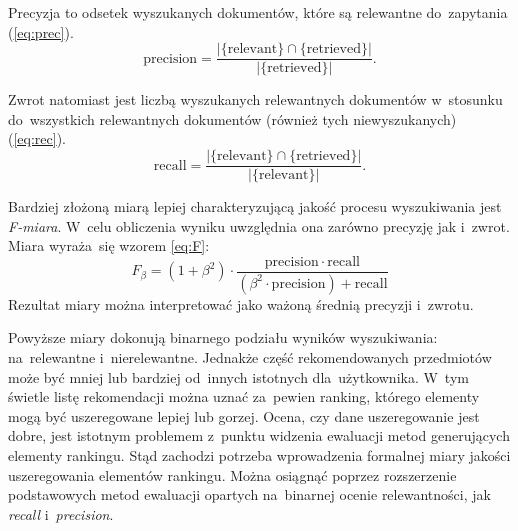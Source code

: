 \documentclass[pl]{minipw} %
\begin{document}
Precyzja to odsetek wyszukanych dokumentów, które są relewantne do~zapytania (\ref{eq:prec}). 
\begin{equation}
\label{eq:prec}
\mathrm{precision}=\frac{|\{\mathrm{relevant}\} \cap \{\mathrm{retrieved}\}|}{|\{\mathrm{retrieved}\}|}.
\end{equation}

Zwrot natomiast jest liczbą wyszukanych relewantnych dokumentów w~stosunku do~wszystkich relewantnych dokumentów (również tych niewyszukanych) (\ref{eq:rec}).
\begin{equation}
\label{eq:rec}
\mathrm{recall}=\frac{|\{\mathrm{relevant}\} \cap \{\mathrm{retrieved}\}|}{|\{\mathrm{relevant}\}|}.
\end{equation}

Bardziej złożoną miarą lepiej charakteryzującą jakość procesu wyszukiwania jest \textit{F-miara}. W~celu obliczenia wyniku uwzględnia ona zarówno precyzję jak i~zwrot. Miara wyraża~się wzorem \ref{eq:F}:
\begin{equation}
\label{eq:F}
F_\beta = (1 + \beta^2) \cdot \frac{\mathrm{precision} \cdot \mathrm{recall}}{(\beta^2 \cdot \mathrm{precision}) + \mathrm{recall}}
\end{equation}
Rezultat miary można interpretować jako ważoną średnią precyzji i~zwrotu. 

Powyższe miary dokonują binarnego podziału wyników wyszukiwania: na~relewantne i~nierelewantne. Jednakże część rekomendowanych przedmiotów może być mniej lub bardziej od~innych istotnych dla~użytkownika. W~tym świetle listę rekomendacji można uznać za~pewien ranking, którego elementy mogą być uszeregowane lepiej lub gorzej. Ocena, czy dane uszeregowanie jest dobre, jest istotnym problemem z~punktu widzenia ewaluacji metod generujących elementy rankingu. Stąd zachodzi potrzeba wprowadzenia formalnej miary jakości uszeregowania elementów rankingu. Można osiągnąć poprzez rozszerzenie podstawowych metod ewaluacji opartych na~binarnej ocenie relewantności, jak \textit{recall} i~\textit{precision}.
\end{document}
